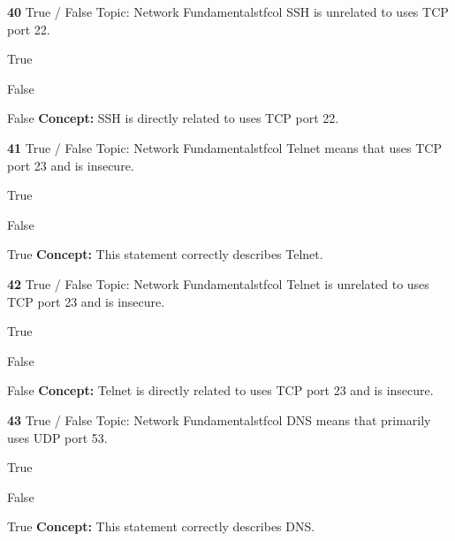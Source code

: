 \documentclass[10pt,a4paper]{article}
\begin{document}
\begin{qcard}{\color{white}\textbf{40} \hfill \small True / False \textbar{} Topic: Network Fundamentals}{tfcol}
SSH is unrelated to uses TCP port 22.

\begin{qoptions}
\item True
\item False
\end{qoptions}
\begin{explainbox}{False}
\textbf{Concept:} SSH is directly related to uses TCP port 22.
\end{explainbox}
\end{qcard}

\begin{qcard}{\color{white}\textbf{41} \hfill \small True / False \textbar{} Topic: Network Fundamentals}{tfcol}
Telnet means that uses TCP port 23 and is insecure.

\begin{qoptions}
\item True
\item False
\end{qoptions}
\begin{explainbox}{True}
\textbf{Concept:} This statement correctly describes Telnet.
\end{explainbox}
\end{qcard}

\begin{qcard}{\color{white}\textbf{42} \hfill \small True / False \textbar{} Topic: Network Fundamentals}{tfcol}
Telnet is unrelated to uses TCP port 23 and is insecure.

\begin{qoptions}
\item True
\item False
\end{qoptions}
\begin{explainbox}{False}
\textbf{Concept:} Telnet is directly related to uses TCP port 23 and is insecure.
\end{explainbox}
\end{qcard}

\begin{qcard}{\color{white}\textbf{43} \hfill \small True / False \textbar{} Topic: Network Fundamentals}{tfcol}
DNS means that primarily uses UDP port 53.

\begin{qoptions}
\item True
\item False
\end{qoptions}
\begin{explainbox}{True}
\textbf{Concept:} This statement correctly describes DNS.
\end{explainbox}
\end{qcard}
\end{document}
